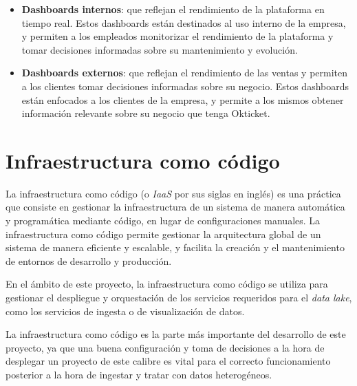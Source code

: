 \begin{itemize}
	\item \textbf{Dashboards internos}: que reflejan el rendimiento de la
		plataforma en tiempo real. Estos dashboards están destinados al uso
		interno de la empresa, y permiten a los empleados monitorizar el
		rendimiento de la plataforma y tomar decisiones informadas sobre su
		mantenimiento y evolución.
	\item \textbf{Dashboards externos}: que reflejan el rendimiento de las
		ventas y permiten a los clientes tomar decisiones informadas sobre su
		negocio. Estos dashboards están enfocados a los clientes de la empresa,
		y permite a los mismos obtener información relevante sobre su negocio
		que tenga Okticket.
\end{itemize}


\section{Infraestructura como código}
La infraestructura como código (o \textit{IaaS} por sus siglas en inglés) es una
práctica que consiste en gestionar la infraestructura de un sistema de manera
automática y programática mediante código, en lugar de configuraciones manuales.
La infraestructura como código permite gestionar la arquitectura global de un
sistema de manera eficiente y escalable, y facilita la creación y el mantenimiento
de entornos de desarrollo y producción.

En el ámbito de este proyecto, la infraestructura como código se utiliza para
gestionar el despliegue y orquestación de los servicios requeridos para el
\textit{data lake}, como los servicios de ingesta o de visualización de datos.

La infraestructura como código es la parte más importante del desarrollo de este
proyecto, ya que una buena configuración y toma de decisiones a la hora de
desplegar un proyecto de este calibre es vital para el correcto funcionamiento
posterior a la hora de ingestar y tratar con datos heterogéneos.

